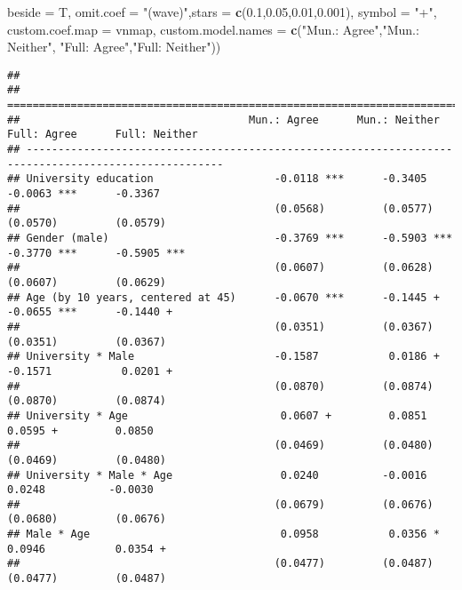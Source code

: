 \documentclass[
]{article}
\newenvironment{Shaded}{\begin{snugshade}}{\end{snugshade}}
\newcommand{\DataTypeTok}[1]{\textcolor[rgb]{0.13,0.29,0.53}{#1}}
\newcommand{\FloatTok}[1]{\textcolor[rgb]{0.00,0.00,0.81}{#1}}
\newcommand{\KeywordTok}[1]{\textcolor[rgb]{0.13,0.29,0.53}{\textbf{#1}}}
\newcommand{\NormalTok}[1]{#1}
\newcommand{\StringTok}[1]{\textcolor[rgb]{0.31,0.60,0.02}{#1}}
\begin{document}
\begin{Shaded}
\begin{Highlighting}[]
          \DataTypeTok{beside =}\NormalTok{ T,}
          \DataTypeTok{omit.coef =} \StringTok{"(wave)"}\NormalTok{,}\DataTypeTok{stars =} \KeywordTok{c}\NormalTok{(}\FloatTok{0.1}\NormalTok{,}\FloatTok{0.05}\NormalTok{,}\FloatTok{0.01}\NormalTok{,}\FloatTok{0.001}\NormalTok{), }\DataTypeTok{symbol =} \StringTok{"+"}\NormalTok{,}
          \DataTypeTok{custom.coef.map =}\NormalTok{ vnmap,}
          \DataTypeTok{custom.model.names =} \KeywordTok{c}\NormalTok{(}\StringTok{"Mun.: Agree"}\NormalTok{,}\StringTok{"Mun.: Neither"}\NormalTok{,}
                                 \StringTok{"Full: Agree"}\NormalTok{,}\StringTok{"Full: Neither"}\NormalTok{))}
\end{Highlighting}
\end{Shaded}

\begin{verbatim}
## 
## =====================================================================================================
##                                    Mun.: Agree      Mun.: Neither    Full: Agree      Full: Neither  
## -----------------------------------------------------------------------------------------------------
## University education                   -0.0118 ***      -0.3405          -0.0063 ***      -0.3367    
##                                        (0.0568)         (0.0577)         (0.0570)         (0.0579)   
## Gender (male)                          -0.3769 ***      -0.5903 ***      -0.3770 ***      -0.5905 ***
##                                        (0.0607)         (0.0628)         (0.0607)         (0.0629)   
## Age (by 10 years, centered at 45)      -0.0670 ***      -0.1445 +        -0.0655 ***      -0.1440 +  
##                                        (0.0351)         (0.0367)         (0.0351)         (0.0367)   
## University * Male                      -0.1587           0.0186 +        -0.1571           0.0201 +  
##                                        (0.0870)         (0.0874)         (0.0870)         (0.0874)   
## University * Age                        0.0607 +         0.0851           0.0595 +         0.0850    
##                                        (0.0469)         (0.0480)         (0.0469)         (0.0480)   
## University * Male * Age                 0.0240          -0.0016           0.0248          -0.0030    
##                                        (0.0679)         (0.0676)         (0.0680)         (0.0676)   
## Male * Age                              0.0958           0.0356 *         0.0946           0.0354 +  
##                                        (0.0477)         (0.0487)         (0.0477)         (0.0487)   

\end{verbatim}
\end{document}
